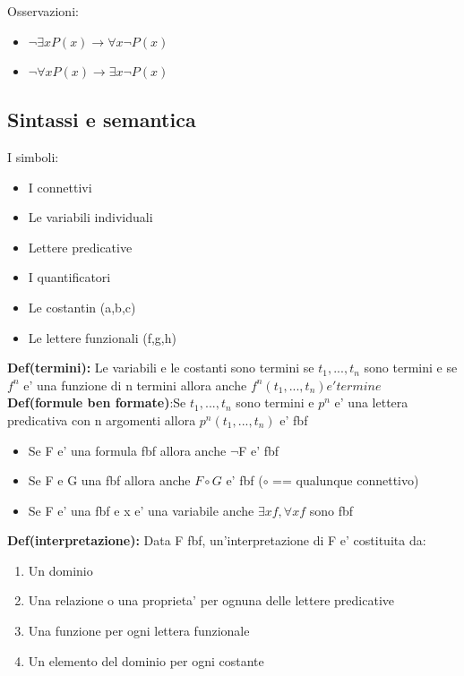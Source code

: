 \documentclass{article}
\begin{document}
        \begin{flushleft}
          Osservazioni:
          \begin{itemize}
            \item $\neg \exists xP(x)\to \forall x \neg P(x)$
            \item $\neg \forall xP(x)\to \exists x \neg P(x)$
          \end{itemize}
        \end{flushleft}
        \subsection{Sintassi e semantica}
        \begin{flushleft}
          I simboli:
          \begin{itemize}
            \item I connettivi
            \item Le variabili individuali
            \item Lettere predicative
            \item I quantificatori 
            \item Le costantin (a,b,c)
            \item Le lettere funzionali (f,g,h)
          \end{itemize}
        \end{flushleft}
        \begin{flushleft}
          \textbf{Def(termini):} Le variabili e le costanti sono termini se $t_1,...,t_n$ sono termini e se $f^n$ e' una funzione di n termini
          allora anche $f^n(t_1,...,t_n) e' termine$
          \textbf{Def(formule ben formate)}:Se $t_1,...,t_n$ sono termini e $p^n$ e' una lettera predicativa con n argomenti allora $p^n(t_1,...,t_n)$ e' fbf
          \begin{itemize}
            \item Se F e' una formula fbf allora anche $\neg$F e' fbf
            \item Se F e G una fbf allora anche $F \circ G$ e' fbf ($\circ$ == qualunque connettivo)
            \item Se F e' una fbf e x e' una variabile anche $\exists xf,\forall xf$ sono fbf
          \end{itemize}
        \end{flushleft}
        \begin{flushleft}
          \textbf{Def(interpretazione):} Data F fbf, un'interpretazione di F e' costituita da:
          \begin{enumerate}
            \item Un dominio
            \item Una relazione o una proprieta' per ognuna delle lettere predicative
            \item Una funzione per ogni lettera funzionale
            \item Un elemento del dominio per ogni costante
          \end{enumerate}
        \end{flushleft}
\end{document}

